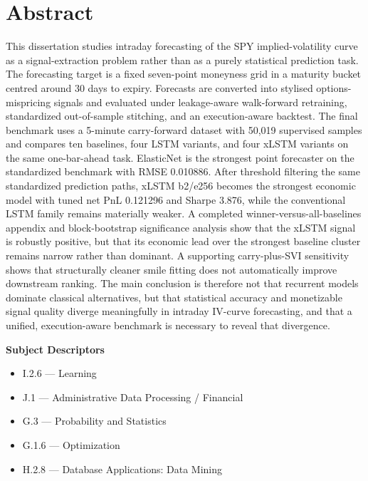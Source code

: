 \documentclass[12pt]{report}
\begin{document}
\cleardoublepage
\setcounter{page}{1}

\chapter*{Abstract}
This dissertation studies intraday forecasting of the SPY implied-volatility curve as a signal-extraction problem rather than as a purely statistical prediction task. The forecasting target is a fixed seven-point moneyness grid in a maturity bucket centred around 30 days to expiry. Forecasts are converted into stylised options-mispricing signals and evaluated under leakage-aware walk-forward retraining, standardized out-of-sample stitching, and an execution-aware backtest. The final benchmark uses a 5-minute carry-forward dataset with 50,019 supervised samples and compares ten baselines, four LSTM variants, and four xLSTM variants on the same one-bar-ahead task. ElasticNet is the strongest point forecaster on the standardized benchmark with RMSE 0.010886. After threshold filtering the same standardized prediction paths, xLSTM b2/e256 becomes the strongest economic model with tuned net PnL 0.121296 and Sharpe 3.876, while the conventional LSTM family remains materially weaker. A completed winner-versus-all-baselines appendix and block-bootstrap significance analysis show that the xLSTM signal is robustly positive, but that its economic lead over the strongest baseline cluster remains narrow rather than dominant. A supporting carry-plus-SVI sensitivity shows that structurally cleaner smile fitting does not automatically improve downstream ranking. The main conclusion is therefore not that recurrent models dominate classical alternatives, but that statistical accuracy and monetizable signal quality diverge meaningfully in intraday IV-curve forecasting, and that a unified, execution-aware benchmark is necessary to reveal that divergence.

\vspace{0.8em}
\noindent\textbf{Subject Descriptors}
\begin{itemize}[leftmargin=1.8cm,itemsep=0.2em,topsep=0.2em]
    \item I.2.6 --- Learning
    \item J.1 --- Administrative Data Processing / Financial
    \item G.3 --- Probability and Statistics
    \item G.1.6 --- Optimization
    \item H.2.8 --- Database Applications: Data Mining
\end{itemize}
\end{document}
